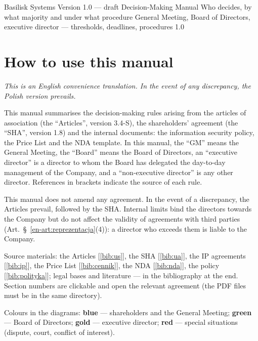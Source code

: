 \documentclass[11pt,a4paper]{report}
\newcommand{\Zr}[1]{[\ref{bib:#1}]}
\begin{document}

\BusinessPlanTitlePage
  {Basilisk Systems}
  {Version 1.0 --- draft}
  {Decision-Making Manual}
  {Who decides, by what majority and under what procedure}
  {General Meeting, Board of Directors, executive director --- thresholds, deadlines, procedures}
  {1.0}

\tableofcontents
\newpage

\section{How to use this manual}

\emph{This is an English convenience translation. In the event of any discrepancy, the Polish version prevails.}

This manual summarises the decision-making rules arising from the articles of association (the ``Articles'', version 3.4-S), the shareholders' agreement (the ``SHA'', version 1.8) and the internal documents: the information security policy, the Price List and the NDA template. In this manual, the ``GM'' means the General Meeting, the ``Board'' means the Board of Directors, an ``executive director'' is a director to whom the Board has delegated the day-to-day management of the Company, and a ``non-executive director'' is any other director. References in brackets indicate the source of each rule.

\begin{Uwaga}
This manual does not amend any agreement. In the event of a discrepancy, the Articles prevail, followed by the SHA. Internal limits bind the directors towards the Company but do not affect the validity of agreements with third parties (Art.~\S~\ref{en-art:reprezentacja}(4)): a director who exceeds them is liable to the Company.
\end{Uwaga}

Source materials: the Articles \Zr{us}, the SHA \Zr{ua}, the IP agreements \Zr{ip}, the Price List \Zr{cennik}, the NDA \Zr{nda}, the policy \Zr{polityka}; legal bases and literature --- in the bibliography at the end. Section numbers are clickable and open the relevant agreement (the PDF files must be in the same directory).

Colours in the diagrams: \textcolor{cWZ}{\textbf{blue}} --- shareholders and the General Meeting; \textcolor{cRD}{\textbf{green}} --- Board of Directors; \textcolor{cDW}{\textbf{gold}} --- executive director; \textcolor{cX}{\textbf{red}} --- special situations (dispute, court, conflict of interest).
\end{document}
